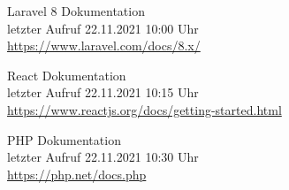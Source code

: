 \begin{thebibliography}{9}
    \bibitem{}
        Laravel 8 Dokumentation
        \\letzter Aufruf 22.11.2021 10:00 Uhr
        \\\url{https://www.laravel.com/docs/8.x/}

    \bibitem{}
        React Dokumentation
        \\letzter Aufruf 22.11.2021 10:15 Uhr
        \\\url{https://www.reactjs.org/docs/getting-started.html}

    \bibitem{}
        PHP Dokumentation
        \\letzter Aufruf 22.11.2021 10:30 Uhr
        \\\url{https://php.net/docs.php}
\end{thebibliography}